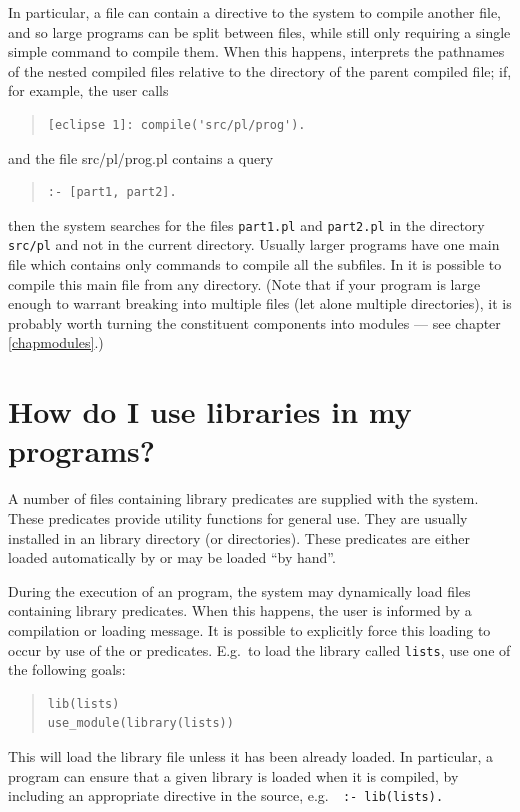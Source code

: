In particular, a file can contain a directive to the system
to compile another file, and so large programs can be split between files,
while still only requiring a single simple command to compile them.
When this happens, {\eclipse} interprets the pathnames of the nested
compiled files relative to the directory of the parent compiled file;
if, for example, the user calls
\begin{quote}
\begin{verbatim}
[eclipse 1]: compile('src/pl/prog').
\end{verbatim}
\end{quote}
and the file src/pl/prog.pl contains a query
\begin{quote}
\begin{verbatim}
:- [part1, part2].
\end{verbatim}
\end{quote}
then the system searches for the files {\tt part1.pl} and {\tt part2.pl} in the
directory {\tt src/pl} and not in the current directory.
Usually larger {\eclipse} programs have one main file which contains
only commands to compile all the subfiles.
In {\eclipse} it is possible to compile this main file from any directory.
(Note that if your program is large enough to warrant breaking into multiple
files (let alone multiple directories), it is probably worth turning the
constituent components into modules --- see chapter \ref{chapmodules}.)

\section{How do I use {\eclipse} libraries in my programs?}

A number of files containing library predicates are supplied with
the {\eclipse} system.
These predicates provide utility functions for general use.
They are usually installed in an {\eclipse} library directory (or
directories).
These predicates are either loaded automatically by {\eclipse} or may be
loaded ``by hand''.

During the execution of an {\eclipse} program, the system may dynamically
load files containing library predicates. When this happens, the user is
informed by a compilation or loading message.
It is possible to explicitly force this loading to occur by use
of the  or
 predicates.
E.g.\ to load the library
called {\tt lists}, use one of the following goals:
\begin{quote}
\begin{verbatim}
lib(lists)
use_module(library(lists))
\end{verbatim} 
\end{quote}
This will load the library file unless it has been already loaded.
In particular, a program can ensure that a given library is loaded when it
is compiled, by including an appropriate directive in the source, e.g.\ {\tt
:- lib(lists).}

